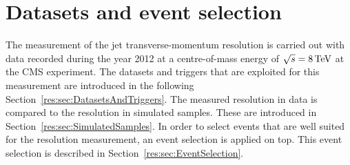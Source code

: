 \FloatBarrier
\chapter{Datasets and event selection}

The measurement of the jet transverse-momentum resolution is carried out with \GAMJET data recorded during the year 2012 at a centre-of-mass energy of $\sqrt{s}=8\,\text{Te}\kern-0.06667em\text{V}$ at the CMS experiment.
The datasets and triggers that are exploited for this measurement are introduced in the following Section~\ref{res:sec:DatasetsAndTriggers}.
The measured resolution in data is compared to the resolution in simulated samples. These are introduced in Section~\ref{res:sec:SimulatedSamples}.
In order to select \GAMJET events that are well suited for the resolution measurement, an event selection is applied on top.
This event selection is described in Section~\ref{res:sec:EventSelection}.

